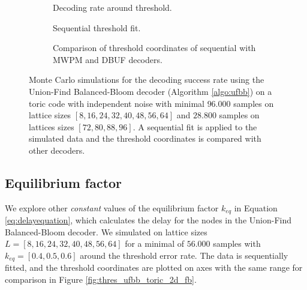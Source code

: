\begin{figure}[htbp]
  \centering
  \begin{subfigure}[b]{0.49\textwidth}
    \begin{adjustbox}{Clip=0 1em 0 0}
      
    \end{adjustbox}
    \caption{Decoding rate around threshold.}\label{fig:thres_ufbb_toric_2d_data}
  \end{subfigure}
  \begin{subfigure}[b]{0.49\textwidth}
    \begin{adjustbox}{Clip=0 1em 0 0}
      
    \end{adjustbox}
    \caption{Sequential threshold fit.}\label{fig:thres_ufbb_toric_2d_seq}
  \end{subfigure}
  \begin{subfigure}[b]{\textwidth}
    \begin{adjustbox}{Clip=0 1em 0 0}
    
    \end{adjustbox}
    \caption{Comparison of threshold coordinates of sequential with MWPM and DBUF decoders.}\label{fig:thres_ufbb_toric_2d_comp}
  \end{subfigure}
  \caption{Monte Carlo simulations for the decoding success rate using the Union-Find Balanced-Bloom decoder (Algorithm \ref{algo:ufbb}) on a toric code with independent noise with minimal $96.000$ samples on lattice sizes $[8, 16, 24, 32, 40, 48, 56, 64]$ and $28.800$ samples on lattices sizes $[72, 80, 88, 96]$. A sequential fit is applied to the simulated data and the threshold coordinates is compared with other decoders.}
  \label{fig:thres_ufbb_toric_2d}
\end{figure}

\subsection{Equilibrium factor}

We explore other \emph{constant} values of the equilibrium factor $k_{eq}$ in Equation \eqref{eq:delayequation}, which calculates the delay for the nodes in the Union-Find Balanced-Bloom decoder. We simulated on lattice sizes $L=[8, 16, 24, 32, 40, 48, 56, 64]$ for a minimal of $56.000$ samples with $k_{eq} = [0.4, 0.5, 0.6]$ around the threshold error rate. The data is sequentially fitted, and the threshold coordinates are plotted on axes with the same range for comparison in Figure \ref{fig:thres_ufbb_toric_2d_fb}. 

